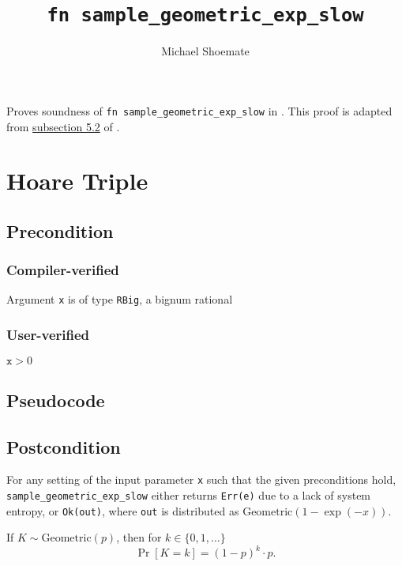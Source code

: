 \documentclass{article}
\title{\texttt{fn sample\_geometric\_exp\_slow}}
\author{Michael Shoemate}
\begin{document}
 
\maketitle 
 
Proves soundness of \texttt{fn sample\_geometric\_exp\_slow} in . 
This proof is adapted from \href{https://arxiv.org/pdf/2004.00010.pdf#subsection.5.2}{subsection 5.2} of \cite{CKS20}. 
 
\section{Hoare Triple} 
\subsection*{Precondition} 
\subsubsection*{Compiler-verified} 
Argument \texttt{x} is of type \texttt{RBig}, a bignum rational 
 
\subsubsection*{User-verified} 
$\texttt{x} > 0$ 
 
\subsection*{Pseudocode}         
 
 
\subsection*{Postcondition}

\begin{theorem}
    \label{postcondition}
    For any setting of the input parameter \texttt{x} such that the given preconditions hold, \\ 
    \texttt{sample\_geometric\_exp\_slow} either returns \texttt{Err(e)} due to a lack of system entropy, 
    or \texttt{Ok(out)}, where \texttt{out} is distributed as $\mathrm{Geometric}(1 - \exp(-x))$.
\end{theorem}

\begin{definition}
    \label{geometric-def}
    If $K \sim \mathrm{Geometric}(p)$, then for $k \in \{0, 1, \ldots\}$
    \begin{equation}
        \Pr[K = k] = (1 - p)^k \cdot p.
    \end{equation}
\end{definition}
\end{document}

